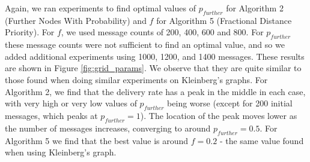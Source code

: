 \documentclass[bsc,frontabs,twoside,singlespacing,parskip,deptreport]{infthesis}     %
\begin{document}
Again, we ran experiments to find optimal values of $p_{further}$ for Algorithm 2 (Further Nodes With Probability) and $f$ for Algorithm 5 (Fractional Distance Priority). For $f$, we used message counts of 200, 400, 600 and 800. For $p_{further}$ these message counts were not sufficient to find an optimal value, and so we added additional experiments using 1000, 1200, and 1400 messages. These results are shown in Figure \ref{fig:grid_params}. We observe that they are quite similar to those found when doing similar experiments on Kleinberg's graphs. For Algorithm 2, we find that the delivery rate has a peak in the middle in each case, with very high or very low values of $p_{further}$ being worse (except for 200 initial messages, which peaks at $p_{further}=1$). The location of the peak moves lower as the number of messages increases, converging to around $p_{further}=0.5$. For Algorithm 5 we find that the best value is around $f=0.2$ - the same value found when using Kleinberg's graph.
\end{document}

